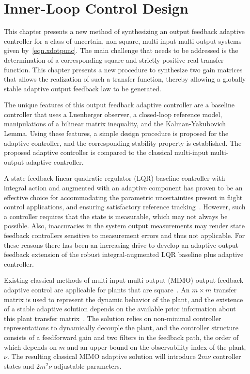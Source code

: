 \chapter{Inner-Loop Control Design}\label{ch.innerLoop}

This chapter presents a new method of synthesizing an output feedback adaptive controller for a class of uncertain, non-square, multi-input multi-output systems given by\ \eqref{eqn.xdotpunc}.
The main challenge that needs to be addressed is the determination of a corresponding square and strictly positive real transfer function.
This chapter presents a new procedure to synthesize two gain matrices that allows the realization of such a transfer function, thereby allowing a globally stable adaptive output feedback law to be generated.

The unique features of this output feedback adaptive controller are a baseline controller that uses a Luenberger observer, a closed-loop reference model, manipulations of a bilinear matrix inequality, and the Kalman-Yakubovich Lemma.
Using these features, a simple design procedure is proposed for the adaptive controller, and the corresponding stability property is established.
The proposed adaptive controller is compared to the classical multi-input multi-output adaptive controller.

A state feedback linear quadratic regulator (LQR) baseline controller with integral action and augmented with an adaptive component has proven to be an effective choice for accommodating the parametric uncertainties present in flight control applications, and ensuring satisfactory reference tracking\ \cite{crespo.adaptivegtm.2009, dydek.adaptivex15.2010, gibson.adaptive.2008, jang.adaptive.2007, lavretskywise.book.2013, matsutani.adaptivegtm.2009, wiese.adaptive.2013}.
However, such a controller requires that the state is measurable, which may not always be possible.
Also, inaccuracies in the system output measurements may render state feedback controllers sensitive to measurement errors and thus not applicable.
For these reasons there has been an increasing drive to develop an adaptive output feedback extension of the robust integral-augmented LQR baseline plus adaptive controller.

Existing classical methods of multi-input multi-output (MIMO) output feedback adaptive control are applicable for plants that are square\ \cite{tao.multivariable.2014}.
An $m\times m$ transfer matrix is used to represent the dynamic behavior of the plant, and the existence of a stable adaptive solution depends on the available prior information about this plant transfer matrix\ \cite{narendra.stable.2005, singh.prior.1984}.
The solution relies on non-minimal controller representations to dynamically decouple the plant, and the controller structure consists of a feedforward gain and two filters in the feedback path, the order of which depends on $m$ and an upper bound on the observability index of the plant, $\nu$.
The resulting classical MIMO adaptive solution will introduce $2m\nu$ controller states and $2m^{2}\nu$ adjustable parameters.

